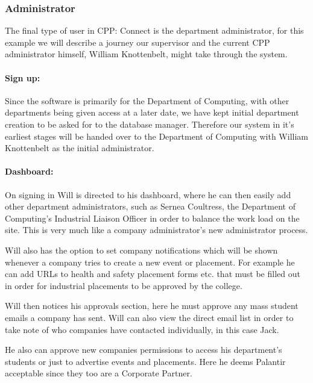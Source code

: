 \subsubsection{Administrator}
  The final type of user in CPP: Connect is the department administrator, for this example we will describe a journey our supervisor and the current CPP administrator himself, William Knottenbelt, might take through the system.
  \paragraph{Sign up:}
    Since the software is primarily for the Department of Computing, with other departments being given access at a later date, we have kept initial department creation to be asked for to the database manager. 
    Therefore our system in it's earliest stages will be handed over to the Department of Computing with William Knottenbelt as the initial administrator.

  \paragraph{Dashboard:}
    On signing in Will is directed to his dashboard, where he can then easily add other department administrators, such as Sernea Coultress, the Department of Computing's Industrial Liaison Officer in order to balance the work load on the site. This is very much like a company administrator's new administrator process.


    Will also has the option to set company notifications which will be shown whenever a company tries to create a new event or placement. For example he can add URLs to health and safety placement forms etc. that must be filled out in order for industrial placements to be approved by the college. 

    Will then notices his approvals section, here he must approve any mass student emails a company has sent. Will can also view the direct email list in order to take note of who companies have contacted individually, in this case Jack.

    He also can approve new companies permissions to access his department's students or just to advertise events and placements. Here he deems Palantir acceptable since they too are a Corporate Partner.

